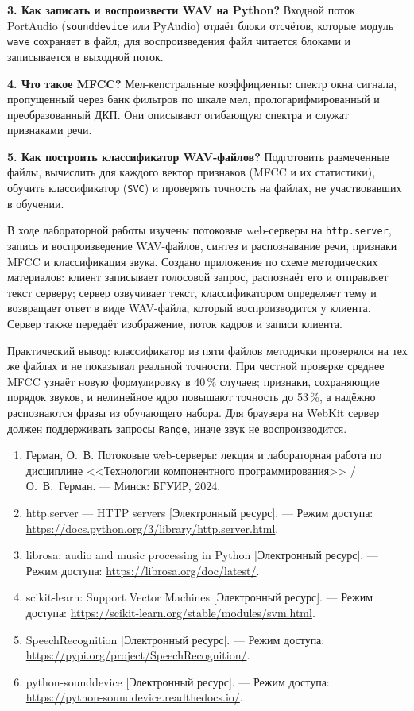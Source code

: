 \documentclass[14pt,a4paper]{extarticle}
\begin{document}
\textbf{3. Как записать и воспроизвести WAV на Python?} Входной поток PortAudio
(\texttt{sounddevice} или PyAudio) отдаёт блоки отсчётов, которые модуль
\texttt{wave} сохраняет в файл; для воспроизведения файл читается блоками и
записывается в выходной поток.

\textbf{4. Что такое MFCC?} Мел-кепстральные коэффициенты: спектр окна сигнала,
пропущенный через банк фильтров по шкале мел, прологарифмированный и преобразованный
ДКП. Они описывают огибающую спектра и служат признаками речи.

\textbf{5. Как построить классификатор WAV-файлов?} Подготовить размеченные файлы,
вычислить для каждого вектор признаков (MFCC и их статистики), обучить классификатор
(\texttt{SVC}) и проверять точность на файлах, не участвовавших в обучении.


В ходе лабораторной работы изучены потоковые web-серверы на \texttt{http.server},
запись и воспроизведение WAV-файлов, синтез и распознавание речи, признаки MFCC и
классификация звука. Создано приложение по схеме методических материалов: клиент
записывает голосовой запрос, распознаёт его и отправляет текст серверу; сервер
озвучивает текст, классификатором определяет тему и возвращает ответ в виде
WAV-файла, который воспроизводится у клиента. Сервер также передаёт изображение, поток
кадров и записи клиента.

Практический вывод: классификатор из пяти файлов методички проверялся на тех же файлах
и не показывал реальной точности. При честной проверке среднее MFCC узнаёт новую
формулировку в 40\,\% случаев; признаки, сохраняющие порядок звуков, и нелинейное ядро
повышают точность до 53\,\%, а надёжно распознаются фразы из обучающего набора. Для
браузера на WebKit сервер должен поддерживать запросы \texttt{Range}, иначе звук не
воспроизводится.


\begin{enumerate}
\item Герман, О.~В. Потоковые web-серверы: лекция и лабораторная работа по дисциплине
<<Технологии компонентного программирования>> / О.~В.~Герман. --- Минск: БГУИР, 2024.
\item http.server --- HTTP servers [Электронный ресурс]. --- Режим доступа:
\url{https://docs.python.org/3/library/http.server.html}.
\item librosa: audio and music processing in Python [Электронный ресурс]. --- Режим
доступа: \url{https://librosa.org/doc/latest/}.
\item scikit-learn: Support Vector Machines [Электронный ресурс]. --- Режим доступа:
\url{https://scikit-learn.org/stable/modules/svm.html}.
\item SpeechRecognition [Электронный ресурс]. --- Режим доступа:
\url{https://pypi.org/project/SpeechRecognition/}.
\item python-sounddevice [Электронный ресурс]. --- Режим доступа:
\url{https://python-sounddevice.readthedocs.io/}.
\end{enumerate}
\end{document}
